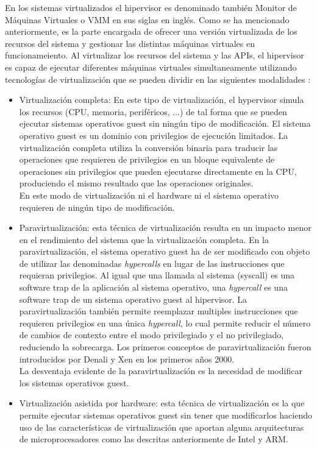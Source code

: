 En los sistemas virtualizados el hipervisor es denominado también Monitor de Máquinas Virtuales o VMM en sus siglas en inglés. Como se ha mencionado anteriormente, es la parte encargada de ofrecer una versión virtualizada de los recursos del sistema y gestionar las distintas máquinas virtuales en funcionameiento. Al virtualizar los recursos del sistema y las APIs, el hipervisor es capaz de ejecutar diferentes máquinas virtuales simultaneamente utilizando tecnologías de virtualización que se pueden dividir en las siguientes modalidades \cite{hyper_perf_arm}:
\begin{itemize}
	\item Virtualización completa: En este tipo de virtualización, el hypervisor simula los recursos (CPU, memoria, periféricos, ...) de tal forma que se pueden ejecutar sistemas operativos guest sin ningún tipo de modificación. El sistema operativo guest es un dominio con privilegios de ejecución limitados. La virtualización completa utiliza la conversión binaria para traducir las operaciones que requieren de privilegios en un bloque equivalente de operaciones sin privilegios que pueden ejecutarse directamente en la CPU, produciendo el mismo resultado que las operaciones originales.\\
	En este modo de virtualización ni el hardware ni el sistema operativo requieren de ningún tipo de modificación.
	\item Paravirtualización: esta técnica de virtualización resulta en un impacto menor en el rendimiento del sistema que la virtualización completa. En la paravirtualización, el sistema operativo guest ha de ser modificado con objeto de utilizar las denominadas \textit{hypercalls} en lugar de las instrucciones que requieran privilegios. Al igual que una llamada al sistema (syscall) es una software trap de la aplicación al sistema operativo, una \textit{hypercall} es una software trap de un sistema operativo guest al hipervisor. La paravirtualización también permite reemplazar multiples instrucciones que requieren privilegios en una única \textit{hypercall}, lo cual permite reducir el número de cambios de contexto entre el modo privilegiado y el no privilegiado, reduciendo la sobrecarga. Los primeros conceptos de paravirtualización fueron introducidos por Denali \cite{denali} y Xen en los primeros años 2000.\\
	La desventaja evidente de la paravirtualización es la necesidad de modificar los sistemas operativos guest.
	\item Virtualización asistida por hardware: esta técnica de virtualización es la que permite ejecutar sistemas operativos guest sin tener que modificarlos haciendo uso de las características de virtualización que aportan alguna arquitecturas de microprocesadores como las descritas anteriormente de Intel y ARM.
\end{itemize}

